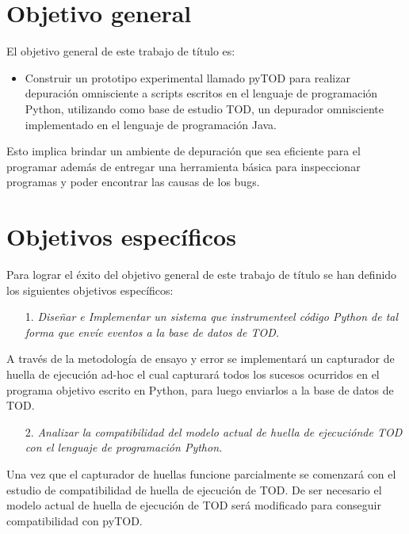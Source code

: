 \documentclass[12pt,a4paper]{report}
\begin{document}
	\section{Objetivo general}

El objetivo general de este trabajo de título es:
\begin{itemize}
\item Construir un prototipo experimental llamado pyTOD para realizar depuración omnisciente a scripts escritos en el lenguaje de programación Python, utilizando como base de estudio TOD, un depurador omnisciente implementado en el lenguaje de programación Java.
\end{itemize}

    Esto implica brindar un ambiente de depuración que sea eficiente para el programar además de entregar una herramienta básica para inspeccionar programas y poder encontrar las causas de los bugs.

	\section{Objetivos específicos}

Para lograr el éxito del objetivo general de este trabajo de título se han definido los siguientes objetivos específicos:

\begin{itemize}
\item[1.] \textit{Diseñar e Implementar un sistema que instrumente\footnotemark[1] el código Python de tal forma que envíe eventos a la base de datos de TOD.}
\end{itemize}

A través de la metodología de ensayo y error se implementará un capturador de huella de ejecución ad-hoc el cual capturará todos los sucesos ocurridos en el programa objetivo escrito en Python, para luego enviarlos a la base de datos de TOD.


\begin{itemize}
\item[2.] \textit{Analizar la compatibilidad del modelo actual de huella de ejecución\footnotemark[2] de TOD con el lenguaje de programación Python.}
\end{itemize}


Una vez que el capturador de huellas funcione parcialmente se comenzará con el estudio de compatibilidad de huella de ejecución de TOD.  De ser necesario el modelo actual de huella de ejecución de TOD será modificado para conseguir compatibilidad con pyTOD.
\end{document}
